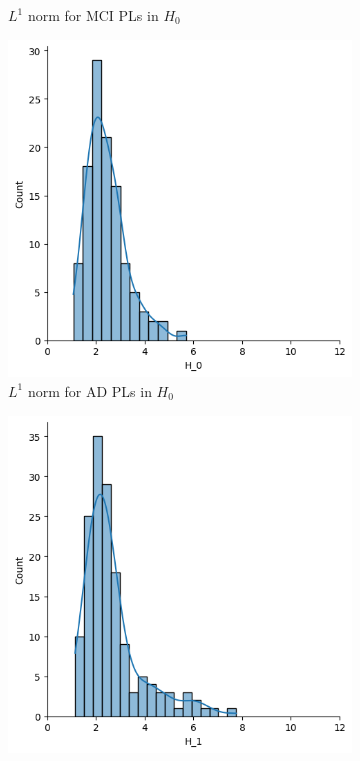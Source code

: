 \documentclass{article}
\begin{document}
\begin{figure}[htb]
\begin{subfigure}{0.32\textwidth}
    \caption{$L^1$ norm for MCI PLs in $H_0$}
  \end{subfigure}
  \begin{subfigure}{0.32\textwidth}
    \includegraphics[width=\textwidth]{figures/median_pls/median_pl_AD_H_0_displot.png}
    \caption{$L^1$ norm for AD PLs in $H_0$}
  \end{subfigure}
  \begin{subfigure}{0.32\textwidth}
    \includegraphics[width=\textwidth]{figures/median_pls/median_pl_CN_H_1_displot.png}

\end{subfigure}
\end{figure}
\end{document}

